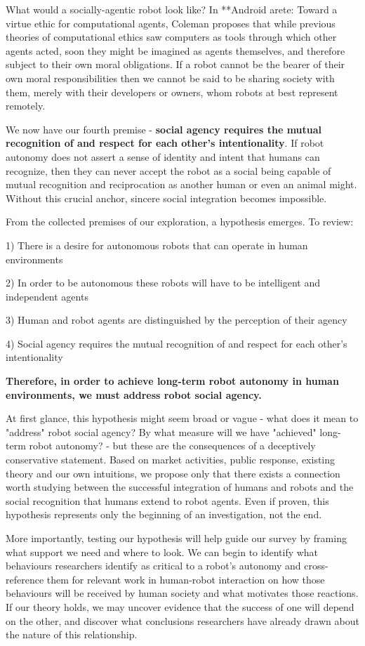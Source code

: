 \documentclass{sfuthesis}
\begin{document}
What would a socially-agentic robot look like? In **Android arete: Toward a virtue ethic for computational agents, Coleman proposes that while previous theories of computational ethics saw computers as tools through which other agents acted, soon they might be imagined as agents themselves, and therefore subject to their own moral obligations. If a robot cannot be the bearer of their own moral responsibilities then we cannot be said to be sharing society with them, merely with their developers or owners, whom robots at best represent remotely.



We now have our fourth premise - \textbf{social agency requires the mutual recognition of and respect for each other's intentionality}. If robot autonomy does not assert a sense of identity and intent that humans can recognize, then they can never accept the robot as a social being capable of mutual recognition and reciprocation as another human or even an animal might. Without this crucial anchor, sincere social integration becomes impossible.

From the collected premises of our exploration, a hypothesis emerges. To review:

1) There is a desire for autonomous robots that can operate in human environments

2) In order to be autonomous these robots will have to be intelligent and independent agents

3) Human and robot agents are distinguished by the perception of their agency

4) Social agency requires the mutual recognition of and respect for each other's intentionality

\textbf{Therefore, in order to achieve long-term robot autonomy in human environments, we must address robot social agency.}

At first glance, this hypothesis might seem broad or vague - what does it mean to "address" robot social agency? By what measure will we have "achieved" long-term robot autonomy? - but these are the consequences of a deceptively conservative statement. Based on market activities, public response, existing theory and our own intuitions, we propose only that there exists a connection worth studying between the successful integration of humans and robots and the social recognition that humans extend to robot agents. Even if proven, this hypothesis represents only the beginning of an investigation, not the end.

More importantly, testing our hypothesis will help guide our survey by framing what support we need and where to look. We can begin to identify what behaviours researchers identify as critical to a robot's autonomy and cross-reference them for relevant work in human-robot interaction on how those behaviours will be received by human society and what motivates those reactions. If our theory holds, we may uncover evidence that the success of one will depend on the other, and discover what conclusions researchers have already drawn about the nature of this relationship.
\end{document}
